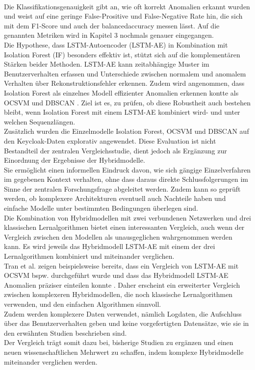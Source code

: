 \documentclass[a4paper,12pt]{article}
\begin{document}
	\\[0.5em]
	Die Klassifikationsgenauigkeit gibt an, wie oft korrekt Anomalien erkannt wurden und weist auf eine geringe False-Prositive und False-Negative Rate hin, die sich mit dem F1-Score und auch der \gls{balancedaccuracy} messen lässt. Auf die genannten Metriken wird in Kapitel 3 nochmals genauer eingegangen.
	\\[0.5em]
	Die Hypothese, dass LSTM-Autoencoder (LSTM-AE) in Kombination mit Isolation Forest (IF) besonders effektiv ist, stützt sich auf die komplementären Stärken beider Methoden. LSTM-AE kann zeitabhängige Muster im Benutzerverhalten erfassen und Unterschiede zwischen normalem und anomalem Verhalten über Rekonstruktionsfehler erkennen. Zudem wird angenommen, dass Isolation Forest als einzelnes Modell effizienter Anomalien erkennen kontte als OCSVM und DBSCAN \cite{Lu2025}. Ziel ist es, zu prüfen, ob diese Robustheit auch bestehen bleibt, wenn Isolation Forest mit einem LSTM-AE kombiniert wird- und unter welchen Sequenzlängen.
	\\[0.5em]
	Zusätzlich wurden die Einzelmodelle Isolation Forest, OCSVM und DBSCAN auf den Keycloak-Daten explorativ angewendet. Diese Evaluation ist nicht Bestandteil der zentralen Vergleichsstudie, dient jedoch als Ergänzung zur Einordnung der Ergebnisse der Hybridmodelle.
	\\[0.5em]
	Sie ermöglicht einen informellen Eindruck davon, wie sich gängige Einzelverfahren im gegebenen Kontext verhalten, ohne dass daraus direkte Schlussfolgerungen im Sinne der zentralen Forschungsfrage abgeleitet werden. Zudem kann so geprüft werden, ob komplexere Architekturen eventuell auch Nachteile haben und einfache Modelle unter bestimmten Bedingungen überlegen sind.
	\\[0.5em]
	Die Kombination von Hybridmodellen mit zwei verbundenen Netzwerken und drei klassischen Lernalgorithmen bietet einen interessanten Vergleich, auch wenn der Vergleich zwischen den Modellen als unausgeglichen wahrgenommen werden kann. Es wird jeweils das Hybridmodell LSTM-AE mit einem der drei Lernalgorithmen kombiniert und miteinander verglichen.
	\\[0.5em]
	Tran et al. zeigen beispielsweise bereits, dass ein Vergleich von LSTM-AE mit OCSVM bspw. durchgeführt wurde und dass das Hybridmodell LSTM-AE Anomalien präziser einteilen konnte \cite{tran2021forecasting}. Daher erscheint ein erweiterter Vergleich zwischen komplexeren Hybridmodellen, die noch klassische Lernalgorithmen verwenden, und den einfachen Algorithmen sinnvoll.
	\\[0.5em]
	Zudem werden komplexere Daten verwendet, nämlich Logdaten, die Aufschluss über das Benutzerverhalten geben und keine vorgefertigten Datensätze, wie sie in den erwähnten Studien beschrieben sind.
	\\[0.5em]
	Der Vergleich trägt somit dazu bei, bisherige Studien zu ergänzen und einen neuen wissenschaftlichen Mehrwert zu schaffen, indem komplexe Hybridmodelle miteinander verglichen werden.
	
\end{document}
